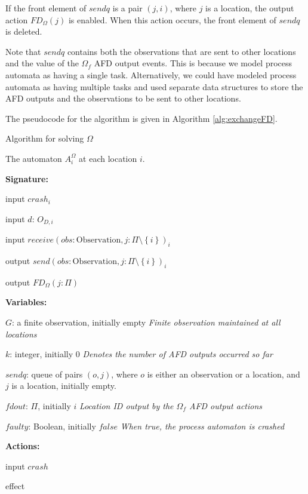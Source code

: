 \documentclass[11pt]{article}
\numberwithin{theorem}{section}
\newcommand{\tab}{\hspace{5mm}}
\newcommand{\set}[1]{\left\{#1\right\}}
\begin{document}
If the front element of $sendq$ is a pair $(j,i)$, where $j$ is a location,
the output action $FD_\Omega(j)$ is enabled. When this action occurs, 
the front element of $sendq$ is deleted.

Note that $sendq$ contains both the observations that are sent to other locations and the value of the $\Omega_f$ AFD output events. This is because we model process automata as having a single task. Alternatively, we could have modeled process automata as having multiple tasks and used separate data structures to store the AFD outputs and the observations to be sent to other locations.



 The pseudocode for the algorithm is given in Algorithm \ref{alg:exchangeFD}.

\begin{algorithm}\footnotesize
\caption{Algorithm for solving $\Omega$}
\label{alg:exchangeFD}
The automaton $A^{\Omega}_i$ at each location $i$.



\textbf{Signature:}

\tab input $crash_i$

\tab input $d$: $O_{D,i}$

\tab input $receive(obs: \text{Observation}, j:\Pi\setminus\set{i})_i$

\tab output $send(obs: \text{Observation}, j:\Pi\setminus\set{i})_i$

\tab output $FD_{\Omega}(j: \Pi)$

\tab 

\textbf{Variables:}

\tab $G$: a finite observation, initially empty \hfill \emph{Finite observation maintained at all locations}

\tab $k$: integer, initially $0$ \hfill \emph{Denotes the number of AFD outputs occurred so far}

\tab $sendq$: queue of pairs $(o,j)$, where $o$ is either an observation or a location, and $j$ is a location, initially empty. 

\tab $fdout$: $\Pi$, initially $i$ \hfill \emph{Location ID output by the $\Omega_f$ AFD output actions}

\tab $faulty$: Boolean, initially $false$ \hfill \emph{When true, the process automaton is crashed}


\tab 


\textbf{Actions:}

\tab input $crash$

\tab effect


\end{algorithm}
\end{document}
